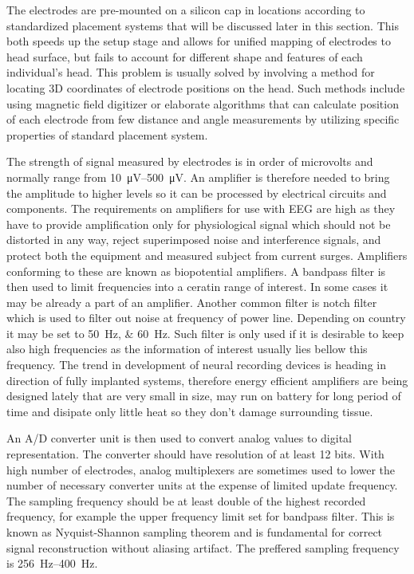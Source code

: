 The electrodes are pre-mounted on a silicon cap in locations according to
standardized placement systems that will be discussed later in this section.
This both speeds up the setup stage and allows for unified mapping of electrodes
to head surface, but fails to account for different shape and features of each
individual's head. \cite{eegFund} This problem is usually solved by involving a
method for locating 3D coordinates of electrode positions on the head. Such
methods include using magnetic field digitizer or elaborate algorithms that can
calculate position of each electrode from few distance and angle measurements by
utilizing specific properties of standard placement system. \cite{rapidPos}

The strength of signal measured by electrodes is in order of microvolts and
normally range from \SIrange{10}{500}{\uV}.\cite{neuralAmp} An amplifier is
therefore needed to bring the amplitude to higher levels so it can be processed
by electrical circuits and components. The requirements on amplifiers for use
with EEG are high as they have to provide amplification only for physiological
signal which should not be distorted in any way, reject superimposed noise and
interference signals, and protect both the equipment and measured subject from
current surges. Amplifiers conforming to these are known as biopotential
amplifiers. \cite{biopotAmp}
A bandpass filter is then used to limit frequencies into a ceratin range of
interest. In some cases it may be already a part of an amplifier.
Another common filter is notch filter which is used to filter out noise
at frequency of power line. Depending on country it may be set to
\SIlist[list-units = single, list-pair-separator = { or }]{50;60}{\Hz}.
\cite{deltaCompNREM} Such filter is only used if it is desirable to keep also
high frequencies as the information of interest usually lies bellow this
frequency.
The trend in development of neural recording devices is heading in direction of
fully implanted systems, therefore energy efficient amplifiers are being
designed lately that are very small in size, may run on battery for long period
of time and disipate only little heat so they don't damage surrounding tissue.
\cite{neuralAmp}

An A/D converter unit is then used to convert analog values to digital
representation. The converter should have resolution of at least 12 bits.
With high number of electrodes, analog multiplexers are sometimes used to lower
the number of necessary converter units at the expense of limited update
frequency. The sampling frequency should be at least double of the highest
recorded frequency, for example the upper frequency limit set for bandpass
filter. This is known as Nyquist-Shannon sampling theorem and is fundamental for
correct signal reconstruction without aliasing artifact. The preffered sampling
frequency is \SIrange{256}{400}{\Hz}. \cite{guidDigEEG}

